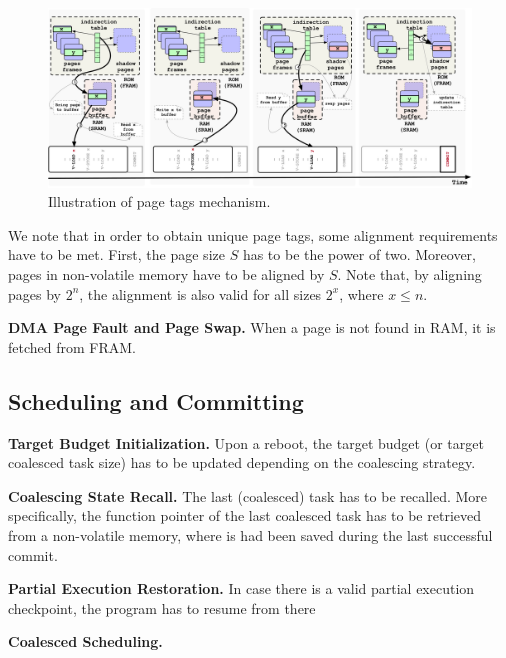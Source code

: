 \begin{figure}
	\centering
	\includegraphics[width=\textwidth]{figures/graffle/paging.pdf}
	\caption{Illustration of \sys page tags mechanism.}
	\label{figure:coala_page_tags}
\end{figure}

We note that in order to obtain unique page tags, some alignment requirements have to be met. First, the page size $S$ has to be the power of two. Moreover, pages in non-volatile memory have to be aligned by $S$. Note that, by aligning pages by $2^n$, the alignment is also valid for all sizes $2^x$, where $x \leq n$.

\noindent \textbf{DMA Page Fault and Page Swap.} When a page is not found in RAM, it is fetched from FRAM. 

\subsection{\sys Scheduling and Committing}

\noindent \textbf{Target Budget Initialization.} Upon a reboot, the target budget (or target coalesced task size) has to be updated depending on the coalescing strategy. 

\noindent \textbf{Coalescing State Recall.} The last (coalesced) task has to be recalled. More specifically, the function pointer of the last coalesced task has to be retrieved from a non-volatile memory, where is had been saved during the last successful commit. 

\noindent \textbf{Partial Execution Restoration.} In case there is a valid partial execution checkpoint, the program has to resume from there 

\noindent \textbf{Coalesced Scheduling.} 

